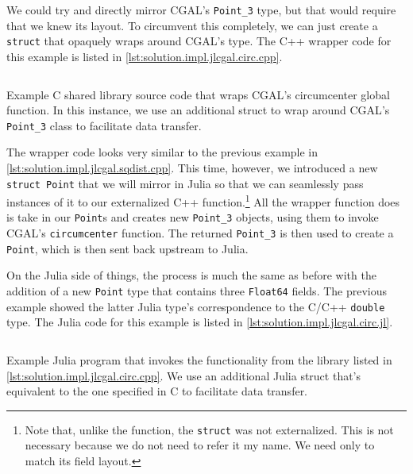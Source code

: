 We could try and directly mirror \ac{CGAL}'s \texttt{Point\_3} type, but that
would require that we knew its layout.  To circumvent this completely, we can
just create a \texttt{struct} that opaquely wraps around \ac{CGAL}'s
type.  The C++ wrapper code for this example is listed in
\cref{lst:solution.impl.jlcgal.circ.cpp}.

\begin{listing}[htb]
  \inputminted{cpp}{cpp/circ.cpp}
  \caption[C wrapper for circumcenter functionality]{
    Example C shared library source code that wraps \ac{CGAL}'s circumcenter
    global function.  In this instance, we use an additional struct to wrap
    around \ac{CGAL}'s \texttt{Point\_3} class to facilitate data transfer.}%
  \label{lst:solution.impl.jlcgal.circ.cpp}
\end{listing}

The wrapper code looks very similar to the previous example in
\cref{lst:solution.impl.jlcgal.sqdist.cpp}.  This time, however, we introduced a
new \texttt{struct Point} that we will mirror in Julia so that we can
seamlessly pass instances of it to our externalized C++ function.\footnote{Note
that, unlike the function, the \texttt{struct} was not externalized.
This is not necessary because we do not need to refer it my name.  We need only
to match its field layout.}  All the wrapper function does is take in our
\texttt{Point}s and creates new \texttt{Point\_3} objects, using them to invoke
\ac{CGAL}'s \texttt{circumcenter} function.  The returned \texttt{Point\_3} is
then used to create a \texttt{Point}, which is then sent back upstream to Julia.

On the Julia side of things, the process is much the same as before with the
addition of a new \texttt{Point} type that contains three
\texttt{Float64} fields. The previous example showed the latter Julia
type's correspondence to the C/C++ \texttt{double} type.  The Julia code
for this example is listed in \cref{lst:solution.impl.jlcgal.circ.jl}.

\begin{listing}[htb]
  \inputminted{julia}{jl/circ.jl}
  \caption[Julia circumcenter example program]{
    Example Julia program that invokes the functionality from the library listed
    in \cref{lst:solution.impl.jlcgal.circ.cpp}.  We use an additional Julia
    struct that's equivalent to the one specified in C to facilitate data
    transfer.}%
  \label{lst:solution.impl.jlcgal.circ.jl}
\end{listing}

